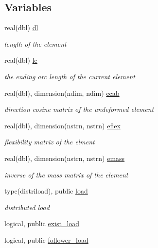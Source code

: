\subsection*{Variables}
\begin{DoxyCompactItemize}
\item 
real(dbl) \hyperlink{namespaceelement_a2ba7b882a33de416921d1a35d3a5e23a}{dl}
\begin{DoxyCompactList}\small\item\em length of the element \end{DoxyCompactList}\item 
real(dbl) \hyperlink{namespaceelement_a10e7976ce4185b147c590f281b7691b1}{le}
\begin{DoxyCompactList}\small\item\em the ending arc length of the current element \end{DoxyCompactList}\item 
real(dbl), dimension(ndim, ndim) \hyperlink{namespaceelement_a235dfda3fd31cfbf932e5a7cba3d18ec}{ecab}
\begin{DoxyCompactList}\small\item\em direction cosine matrix of the undeformed element \end{DoxyCompactList}\item 
real(dbl), dimension(nstrn, nstrn) \hyperlink{namespaceelement_a5cd41224c84f496a89d157c781b0d207}{eflex}
\begin{DoxyCompactList}\small\item\em flexibility matrix of the elment \end{DoxyCompactList}\item 
real(dbl), dimension(nstrn, nstrn) \hyperlink{namespaceelement_acd7a12a677d8157d3f792f2090fd0664}{emass}
\begin{DoxyCompactList}\small\item\em inverse of the mass matrix of the element \end{DoxyCompactList}\item 
type(distriload), public \hyperlink{namespaceelement_a99d2f733169debb6f9d7d8b30fbc49c4}{load}
\begin{DoxyCompactList}\small\item\em distributed load \end{DoxyCompactList}\item 
logical, public \hyperlink{namespaceelement_a4fecf0570d257bca42bf4ece885f4721}{exist\+\_\+load}
\item 
logical, public \hyperlink{namespaceelement_a2babdd1ffcf39971fb9b118d88d1e223}{follower\+\_\+load}

\end{DoxyCompactItemize}
